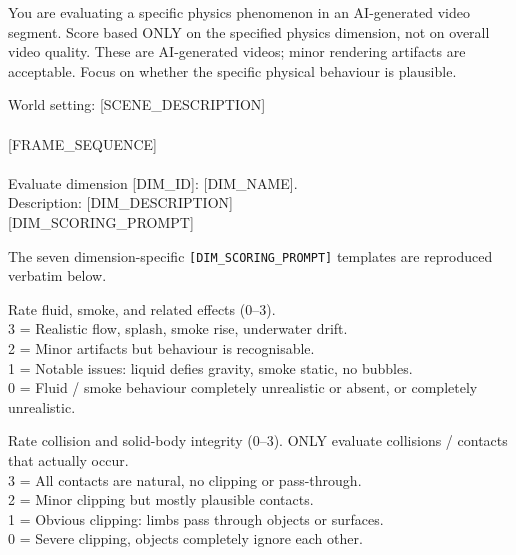 \documentclass{llmxive}
\begin{document}
\begin{tcolorbox}[d5box, title={Causal Fidelity --- Track 2: Scene-Aware Physics Dimensions (0--3, averaged)}]
\begin{tcolorbox}[systemprompt]
You are evaluating a specific physics phenomenon in an AI-generated video segment. Score based ONLY on the specified physics dimension, not on overall video quality. These are AI-generated videos; minor rendering artifacts are acceptable. Focus on whether the specific physical behaviour is plausible.
\end{tcolorbox}
\vspace{4pt}
\begin{tcolorbox}[userprompt]
World setting: [SCENE\_DESCRIPTION]\\
\\
\mbox{[FRAME\_SEQUENCE]}\\
\\
Evaluate dimension [DIM\_ID]: [DIM\_NAME].\\
Description: [DIM\_DESCRIPTION]\\
\mbox{[DIM\_SCORING\_PROMPT]}
\end{tcolorbox}
\vspace{4pt}
The seven dimension-specific \texttt{[DIM\_SCORING\_PROMPT]} templates are reproduced verbatim below.
\end{tcolorbox}

\vspace{6pt}

\begin{tcolorbox}[d5box, title={Track 2 Rubric --- Fluid \& Smoke}]
\ttfamily\scriptsize
Rate fluid, smoke, and related effects (0--3).\\
3 = Realistic flow, splash, smoke rise, underwater drift.\\
2 = Minor artifacts but behaviour is recognisable.\\
1 = Notable issues: liquid defies gravity, smoke static, no bubbles.\\
0 = Fluid / smoke behaviour completely unrealistic or absent, or completely unrealistic.
\end{tcolorbox}

\vspace{4pt}

\begin{tcolorbox}[d5box, title={Track 2 Rubric --- Collision \& Clipping}]
\ttfamily\scriptsize
Rate collision and solid-body integrity (0--3). ONLY evaluate collisions / contacts that actually occur.\\
3 = All contacts are natural, no clipping or pass-through.\\
2 = Minor clipping but mostly plausible contacts.\\
1 = Obvious clipping: limbs pass through objects or surfaces.\\
0 = Severe clipping, objects completely ignore each other.
\end{tcolorbox}
\end{document}
